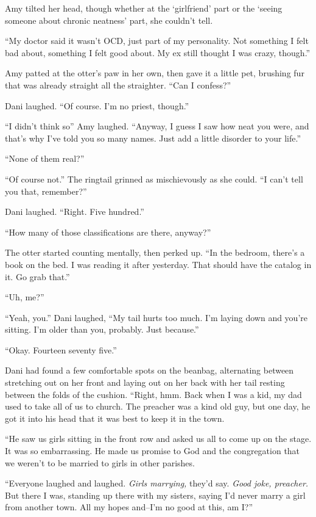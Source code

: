 Amy tilted her head, though whether at the `girlfriend' part or the `seeing someone about chronic neatness' part, she couldn't tell.

``My doctor said it wasn't OCD, just part of my personality. Not something I felt bad about, something I felt good about. My ex still thought I was crazy, though.''

Amy patted at the otter's paw in her own, then gave it a little pet, brushing fur that was already straight all the straighter. ``Can I confess?''

Dani laughed. ``Of course. I'm no priest, though.''

``I didn't think so'' Amy laughed. ``Anyway, I guess I saw how neat you were, and that's why I've told you so many names. Just add a little disorder to your life.''

``None of them real?''

``Of course not.'' The ringtail grinned as mischievously as she could. ``I can't tell you that, remember?''

Dani laughed. ``Right. Five hundred.''

``How many of those classifications are there, anyway?''

The otter started counting mentally, then perked up. ``In the bedroom, there's a book on the bed. I was reading it after yesterday. That should have the catalog in it. Go grab that.''

``Uh, me?''

``Yeah, you.'' Dani laughed, ``My tail hurts too much. I'm laying down and you're sitting. I'm older than you, probably. Just because.''

\secdiv{}

\noindent ``Okay. Fourteen seventy five.''

Dani had found a few comfortable spots on the beanbag, alternating between stretching out on her front and laying out on her back with her tail resting between the folds of the cushion. ``Right, hmm. Back when I was a kid, my dad used to take all of us to church. The preacher was a kind old guy, but one day, he got it into his head that it was best to keep it in the town.

``He saw us girls sitting in the front row and asked us all to come up on the stage. It was so embarrassing. He made us promise to God and the congregation that we weren't to be married to girls in other parishes.

``Everyone laughed and laughed. \emph{Girls marrying,} they'd say. \emph{Good joke, preacher.} But there I was, standing up there with my sisters, saying I'd never marry a girl from another town. All my hopes and--I'm no good at this, am I?''

